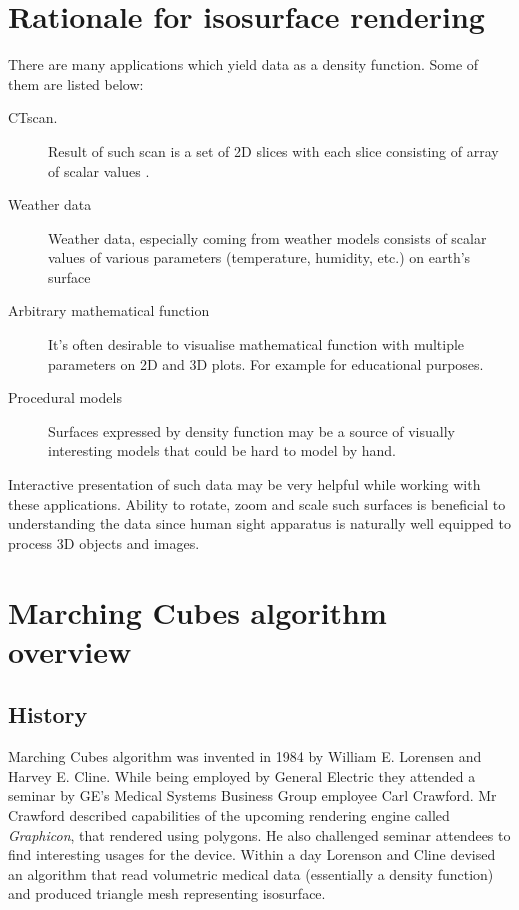 \section{Rationale for isosurface rendering}

There are many applications which yield data as a density function. Some of them
are listed below:
\begin{description}
	\item[CT\footnotemark scan.]
		Result of such scan is a set of 2D slices with each slice
		consisting of array of scalar values \parencite{Lorensen:1987:MCH:37402.37422}.
	\item[Weather data]
		Weather data, especially coming from weather models consists of
		scalar values of various parameters (temperature, humidity, etc.)
		on earth's surface
	\item[Arbitrary mathematical function]
		It's often desirable to visualise mathematical function with
		multiple parameters on 2D and 3D plots. For example for
		educational purposes.
	\item[Procedural models]
		Surfaces expressed by density function may be a source of
		visually interesting models that could be hard to model by hand.
\end{description}

Interactive presentation of such data may be very helpful while working with
these applications. Ability to rotate, zoom and scale such surfaces is
beneficial to understanding the data since human sight apparatus is naturally
well equipped to process 3D objects and images.

\section{Marching Cubes algorithm overview}
\subsection{History \parencite{mchist}}
Marching Cubes algorithm was invented in 1984 by William E. Lorensen and Harvey
E. Cline. While being employed by General Electric they attended a seminar by
GE's Medical Systems Business Group employee Carl Crawford. Mr Crawford
described capabilities of the upcoming rendering engine called \emph{Graphicon},
that rendered using polygons. He also challenged seminar attendees to find
interesting usages for the device. Within a day Lorenson and Cline devised an
algorithm that read volumetric medical data (essentially a density function) and
produced triangle mesh representing isosurface.

